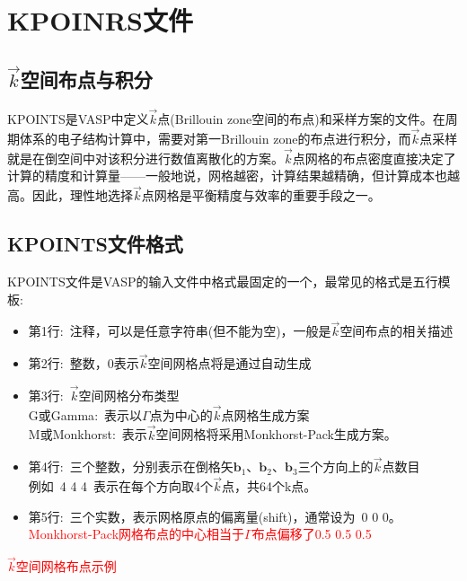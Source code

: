 \section{\rm{KPOINRS}文件}%
\subsection{$\vec k$空间布点与积分}
\textrm{KPOINTS}是\textrm{VASP}中定义$\vec k$点(\textrm{Brillouin zone}空间的布点)和采样方案的文件。在周期体系的电子结构计算中，需要对第一\textrm{Brillouin zone}的布点进行积分，而$\vec k$点采样就是在倒空间中对该积分进行数值离散化的方案。$\vec k$点网格的布点密度直接决定了计算的精度和计算量——一般地说，网格越密，计算结果越精确，但计算成本也越高。因此，理性地选择$\vec k$点网格是平衡精度与效率的重要手段之一。
\subsection{\rm{KPOINTS}文件格式}
\textrm{KPOINTS}文件是\textrm{VASP}的输入文件中格式最固定的一个，最常见的格式是五行模板:
\begin{itemize}
 \item 第1行:~注释，可以是任意字符串(但不能为空)，一般是$\vec k$空间布点的相关描述
 \item 第2行:~整数，0表示$\vec k$空间网格点将是通过自动生成
 \item 第3行:~$\vec k$空间网格分布类型\\
	 \textrm{G}或\textrm{Gamma}:~表示以$\Gamma$点为中心的$\vec k$点网格生成方案\\
	 \textrm{M}或\textrm{Monkhorst}:~表示$\vec k$空间网格将采用\textrm{Monkhorst-Pack}生成方案。

 \item 第4行:~三个整数，分别表示在倒格矢$\mathbf{b}_1$、$\mathbf{b}_2$、$\mathbf{b}_3$三个方向上的$\vec k$点数目\\
	 例如~4 4 4~表示在每个方向取4个$\vec k$点，共64个k点。

 \item 第5行:~三个实数，表示网格原点的偏离量\textrm{(shift)}，通常设为~0 0 0。\textcolor{red}{\textrm{Monkhorst-Pack}网格布点的中心相当于$\Gamma$布点偏移了0.5 0.5 0.5}
\end{itemize}

\textcolor{red}{$\vec k$空间网格布点示例}
{\fontsize{9.2pt}{7.2pt}\selectfont{
}}
